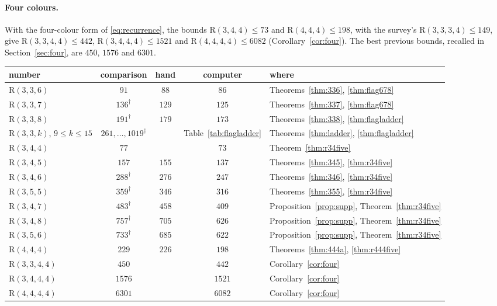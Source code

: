 \documentclass[11pt]{article}
\theoremstyle{spacedplain}
\theoremstyle{spaceddef}
\theoremstyle{spacedremark}
\newcommand{\R}{\mathrm{R}}
\begin{document}
\paragraph{Four colours.}
With the four-colour form of \eqref{eq:recurrence}, the bounds $\R(3,4,4)\le 73$ and $\R(4,4,4)\le 198$, with the survey's $\R(3,3,3,4)\le 149$, give ${\R(3,3,4,4)\le 442}$, ${\R(3,4,4,4)\le 1521}$ and ${\R(4,4,4,4)\le 6082}$ (Corollary~\ref{cor:four}).
The best previous bounds, recalled in Section~\ref{sec:four}, are $450$, $1576$ and $6301$.


\begin{table}[t]
\centering\small
\begin{tabular}{lcccl}
\toprule
number & comparison & hand & computer & where\\
\midrule
$\R(3,3,6)$ & $91$ \cite{Rad26,Boz26} & $88$ & $86$ & Theorems~\ref{thm:336}, \ref{thm:flag678}\\
$\R(3,3,7)$ & $136^\dagger$ & $129$ & $125$ & Theorems~\ref{thm:337}, \ref{thm:flag678}\\
$\R(3,3,8)$ & $191^\dagger$ & $179$ & $173$ & Theorems~\ref{thm:338}, \ref{thm:flagladder}\\
$\R(3,3,k)$, $9\le k\le 15$ & $261,\dots,1019^\dagger$ & & Table~\ref{tab:flagladder} & Theorems~\ref{thm:ladder}, \ref{thm:flagladder}\\
$\R(3,4,4)$ & $77$ \cite{Rad26} & & $73$ & Theorem~\ref{thm:r34five}\\
$\R(3,4,5)$ & $157$ \cite{Boz26} & $155$ & $137$ & Theorems~\ref{thm:345}, \ref{thm:r34five}\\
$\R(3,4,6)$ & $288^\dagger$ & $276$ & $247$ & Theorems~\ref{thm:346}, \ref{thm:r34five}\\
$\R(3,5,5)$ & $359^\dagger$ & $346$ & $316$ & Theorems~\ref{thm:355}, \ref{thm:r34five}\\
$\R(3,4,7)$ & $483^\dagger$ & $458$ & $409$ & Proposition~\ref{prop:supp}, Theorem~\ref{thm:r34five}\\
$\R(3,4,8)$ & $757^\dagger$ & $705$ & $626$ & Proposition~\ref{prop:supp}, Theorem~\ref{thm:r34five}\\
$\R(3,5,6)$ & $733^\dagger$ & $685$ & $622$ & Proposition~\ref{prop:supp}, Theorem~\ref{thm:r34five}\\
$\R(4,4,4)$ & $229$ \cite{Boz26} & $226$ & $198$ & Theorems~\ref{thm:444a}, \ref{thm:r444five}\\
\midrule
$\R(3,3,4,4)$ & $450$ \cite{Rad26} & & $442$ & Corollary~\ref{cor:four}\\
$\R(3,4,4,4)$ & $1576$ \cite{Rad26,Boz26} & & $1521$ & Corollary~\ref{cor:four}\\
$\R(4,4,4,4)$ & $6301$ \cite{Rad26,Boz26} & & $6082$ & Corollary~\ref{cor:four}\\
\bottomrule
\end{tabular}


\end{table}
\end{document}
